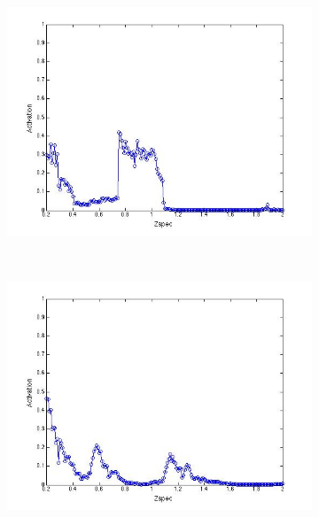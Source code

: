 \documentclass[useAMS,usenatbib,fleqn]{mn2e}
\begin{document}
\begin{figure}
        \begin{subfigure}[b]{0.075\textwidth}
                \includegraphics[trim = 35px 15px 50px 25px, clip=true,width=\textwidth]{figures/activation_01.jpg}
        \end{subfigure}
	~
        \begin{subfigure}[b]{0.075\textwidth}
                \includegraphics[trim = 35px 15px 50px 25px, clip=true,width=\textwidth]{figures/activation_02.jpg}
        \end{subfigure}
        ~
        \begin{subfigure}[b]{0.075\textwidth}

\end{subfigure}
\end{figure}
\end{document}
